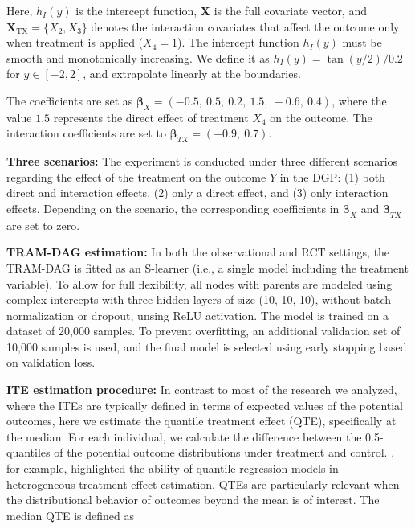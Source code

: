 Here, $h_I(y)$ is the intercept function, $\mathbf{X}$ is the full covariate vector, and $\mathbf{X}_{\text{TX}} = \{X_2, X_3\}$ denotes the interaction covariates that affect the outcome only when treatment is applied ($X_4 = 1$). The intercept function $h_I(y)$ must be smooth and monotonically increasing. We define it as $h_I(y) = \tan(y/2) / 0.2$ for $y \in [-2, 2]$, and extrapolate linearly at the boundaries.

The coefficients are set as $\boldsymbol{\beta}_X = (-0.5,\ 0.5,\ 0.2,\ 1.5,\ -0.6,\ 0.4)$, where the value $1.5$ represents the direct effect of treatment $X_4$ on the outcome. The interaction coefficients are set to $\boldsymbol{\beta}_{TX} = (-0.9,\ 0.7)$.

\medskip

\textbf{Three scenarios:} The experiment is conducted under three different scenarios regarding the effect of the treatment on the outcome $Y$ in the DGP: (1) both direct and interaction effects, (2) only a direct effect, and (3) only interaction effects. Depending on the scenario, the corresponding coefficients in $\boldsymbol{\beta}_X$ and $\boldsymbol{\beta}_{TX}$ are set to zero.

\medskip


\textbf{TRAM-DAG estimation:} In both the observational and RCT settings, the TRAM-DAG is fitted as an S-learner (i.e., a single model including the treatment variable). To allow for full flexibility, all nodes with parents are modeled using complex intercepts with three hidden layers of size (10, 10, 10), without batch normalization or dropout, unsing ReLU activation. The model is trained on a dataset of 20,000 samples. To prevent overfitting, an additional validation set of 10,000 samples is used, and the final model is selected using early stopping based on validation loss.

\medskip

\textbf{ITE estimation procedure:} In contrast to most of the research we analyzed, where the ITEs are typically defined in terms of expected values of the potential outcomes, here we estimate the quantile treatment effect (QTE), specifically at the median. For each individual, we calculate the difference between the 0.5-quantiles of the potential outcome distributions under treatment and control. \citet{chernozhukov2005}, for example, highlighted the ability of quantile regression models in heterogeneous treatment effect estimation. QTEs are particularly relevant when the distributional behavior of outcomes beyond the mean is of interest. The median QTE is defined as

